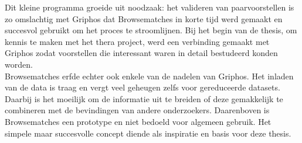 Dit kleine programma groeide uit noodzaak: het valideren van paarvoorstellen is zo omslachtig met Griphos dat Browsematches in korte tijd werd gemaakt en succesvol gebruikt om het proces te stroomlijnen. Bij het begin van de thesis, om kennis te maken met het thera project, werd een verbinding gemaakt met Griphos zodat voorstellen die interessant waren in detail bestudeerd konden worden.\\

Browsematches erfde echter ook enkele van de nadelen van Griphos. Het inladen van de data is traag en vergt veel geheugen zelfs voor gereduceerde datasets. Daarbij is het moeilijk om de informatie uit te breiden of deze gemakkelijk te combineren met de bevindingen van andere onderzoekers. Daarenboven is Browsematches een prototype en niet bedoeld voor algemeen gebruik. Het simpele maar succesvolle concept diende als inspiratie en basis voor deze thesis. 

